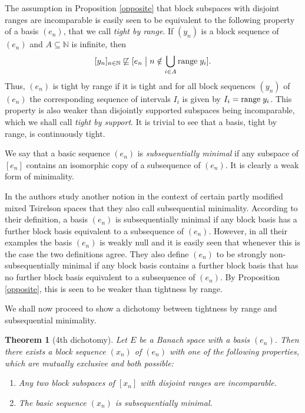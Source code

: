 \documentclass[10pt]{amsart}
\numberwithin{equation}{section}
\newtheorem{thm}{Theorem}[section]
\begin{document}
The assumption in Proposition \ref{opposite} that block subspaces with disjoint
ranges are incomparable is easily seen to be equivalent to the following
property of a basis $(e_n)$, that we call {\em tight by range}. If $(y_n)$ is a
block sequence of $(e_n)$ and $A\subseteq {\mathbb N}$ is infinite, then
$$
[y_n]_{n\in {\mathbb N}}\not\sqsubseteq [e_n{ \; \big| \;} n\notin \bigcup_{i\in A}{\rm range} \;y_i].
$$
Thus, $(e_n)$ is tight by range if it is tight and for all block sequences
$(y_n)$ of $(e_n)$ the corresponding sequence of intervals $I_i$ is given by
$I_i={\rm range}\; y_i$. This property is also weaker than disjointly supported
subspaces being incomparable, which we shall call {\em tight by support}. It is
trivial to see that a basis, tight by range, is continuously tight.

We say that a basic sequence $(e_n)$ is   {\em subsequentially minimal} if any
subspace of $[e_n]$ contains an isomorphic copy of a subsequence of $(e_n)$. It
is clearly a weak form of minimality.

In \cite{KLMT} the authors study another notion in the context of certain
partly modified mixed Tsirelson spaces that they also call subsequential
minimality. According to their definition, a basis $(e_n)$ is subsequentially
minimal if any block basis has a further block basis equivalent to a
subsequence of $(e_n)$. However, in all their examples the basis $(e_n)$ is
weakly null and it is easily seen that whenever this is the case the two
definitions agree. They also define $(e_n)$ to be strongly non-subsequentially
minimal if any block basis contains a further block basis that has no further
block basis  equivalent to a subsequence of $(e_n)$. By Proposition
\ref{opposite}, this is seen to be weaker than tightness by range.

We shall now proceed to show a dichotomy between tightness by range and subsequential minimality.

\begin{thm}[4th dichotomy]\label{reflexionsdansunbus}
Let $E$ be a Banach space with a basis $(e_n)$. Then there exists a block
sequence $(x_n)$ of $(e_n)$ with one of the following properties, which are
mutually exclusive and both possible:
\begin{enumerate}
  \item Any two block subspaces of $[x_n]$ with disjoint ranges are incomparable.
  \item The basic sequence $(x_n)$ is subsequentially minimal.
\end{enumerate}
\end{thm}
\end{document}

